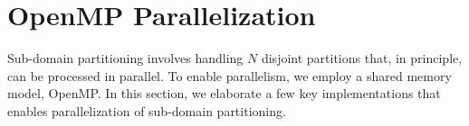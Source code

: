 \documentclass{article}
\begin{document}




\section{OpenMP Parallelization}
\label{sec: parallelization}
Sub-domain partitioning involves handling $N$ disjoint partitions that, in principle, can be processed in parallel. To enable parallelism, 
we employ a shared memory model, OpenMP. In this section, we elaborate a few key implementations that enables parallelization of sub-domain partitioning. 
\end{document}
